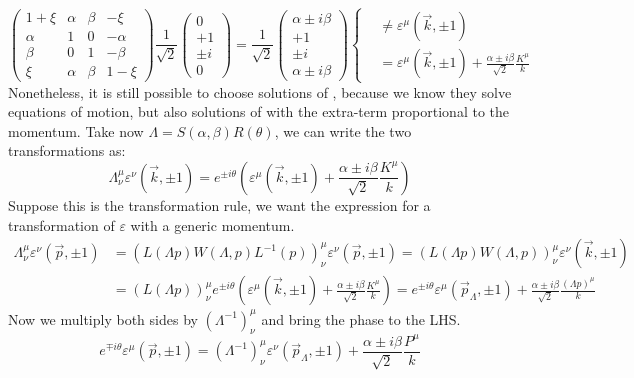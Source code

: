 \documentclass[../main.tex]{subfiles}
\begin{document}
\[
\left(\begin{array}{cccc}
    1+\xi & \alpha & \beta & -\xi \\
    \alpha & 1 & 0 & -\alpha \\
    \beta & 0 & 1 & -\beta \\
    \xi & \alpha & \beta & 1-\xi
\end{array}\right)\frac{1}{\sqrt{2}}\left(\begin{array}{c}
    0 \\
    +1 \\
    \pm i \\
    0
\end{array}\right)=\frac{1}{\sqrt{2}}\left(\begin{array}{c}
    \alpha\pm i\beta \\
    +1 \\
    \pm i \\
    \alpha\pm i\beta
\end{array}\right)\left\{
\begin{aligned}
&\neq\varepsilon^\mu(\vec{k},\pm1)\\
&=\varepsilon^\mu(\vec{k},\pm1)+\frac{\alpha\pm i\beta}{\sqrt{2}}\frac{K^\mu}{k}
\end{aligned}
\right.
\]
Nonetheless, it is still possible to choose solutions of , because we know they solve equations of motion, but also solutions of  with the extra-term proportional to the momentum. Take now $\Lambda=S(\alpha,\beta)R(\theta)$, we can write the two transformations as:
\[
\Lambda^\mu_\nu\varepsilon^\nu(\vec{k},\pm1)=e^{\pm i\theta}\left(\varepsilon^\mu(\vec{k},\pm1)+\frac{\alpha\pm i\beta}{\sqrt{2}}\frac{K^\mu}{k}\right)
\]
Suppose this is the transformation rule, we want the expression for a transformation of $\varepsilon$ with a generic momentum.
\begin{align*}
\Lambda^\mu_\nu\varepsilon^\nu(\vec{p},\pm1)&=\left(L(\Lambda p)W(\Lambda,p)L^{-1}(p)\right)^\mu_\nu\varepsilon^\nu(\vec{p},\pm1)=\left(L(\Lambda p)W(\Lambda,p)\right)^\mu_\nu\varepsilon^\nu(\vec{k},\pm1)\\
&=(L(\Lambda p))^\mu_\nu e^{\pm i\theta}\left(\varepsilon^\mu(\vec{k},\pm1)+\frac{\alpha\pm i\beta}{\sqrt{2}}\frac{K^\mu}{k}\right)=e^{\pm i\theta}\varepsilon^\mu(\vec{p}_\Lambda,\pm1)+\frac{\alpha\pm i\beta}{\sqrt{2}}\frac{(\Lambda p)^\mu}{k}
\end{align*}
Now we multiply both sides by $(\Lambda^{-1})^\mu_\nu$ and bring the phase to the LHS.
\[
e^{\mp i\theta}\varepsilon^\mu(\vec{p},\pm1)=(\Lambda^{-1})^\mu_\nu\varepsilon^\nu(\vec{p}_\Lambda,\pm1)+\frac{\alpha\pm i\beta}{\sqrt{2}}\frac{P^\mu}{k}
\]
\end{document}
